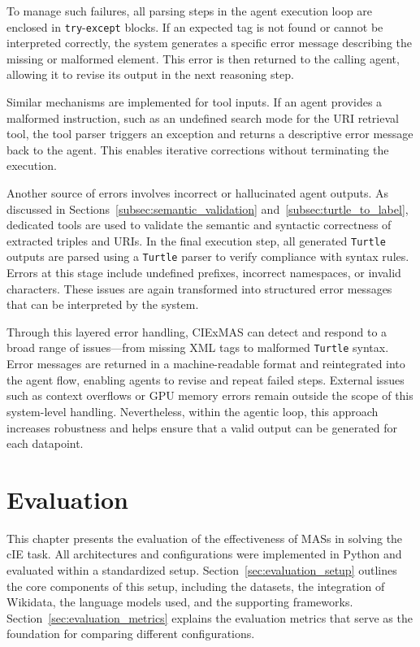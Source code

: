 \documentclass[a4paper,oneside,bibliography=totoc]{scrbook}
\begin{document}
To manage such failures, all parsing steps in the agent execution loop are enclosed in \texttt{try}-\texttt{except} blocks. If an expected tag is not found or cannot be interpreted correctly, the system generates a specific error message describing the missing or malformed element. This error is then returned to the calling agent, allowing it to revise its output in the next reasoning step.

Similar mechanisms are implemented for tool inputs. If an agent provides a malformed instruction, such as an undefined search mode for the URI retrieval tool, the tool parser triggers an exception and returns a descriptive error message back to the agent. This enables iterative corrections without terminating the execution.

Another source of errors involves incorrect or hallucinated agent outputs. As discussed in Sections~\ref{subsec:semantic_validation} and~\ref{subsec:turtle_to_label}, dedicated tools are used to validate the semantic and syntactic correctness of extracted triples and URIs. In the final execution step, all generated \texttt{Turtle} outputs are parsed using a \texttt{Turtle} parser to verify compliance with syntax rules. Errors at this stage include undefined prefixes, incorrect namespaces, or invalid characters. These issues are again transformed into structured error messages that can be interpreted by the system.

Through this layered error handling, CIExMAS can detect and respond to a broad range of issues—from missing XML tags to malformed \texttt{Turtle} syntax. Error messages are returned in a machine-readable format and reintegrated into the agent flow, enabling agents to revise and repeat failed steps. External issues such as context overflows or GPU memory errors remain outside the scope of this system-level handling. Nevertheless, within the agentic loop, this approach increases robustness and helps ensure that a valid output can be generated for each datapoint.

\chapter{Evaluation}
\label{ch:evaluation}

This chapter presents the evaluation of the effectiveness of \acp{MAS} in solving the \ac{cIE} task. All architectures and configurations were implemented in Python and evaluated within a standardized setup. Section~\ref{sec:evaluation_setup} outlines the core components of this setup, including the datasets, the integration of Wikidata, the language models used, and the supporting frameworks. Section~\ref{sec:evaluation_metrics} explains the evaluation metrics that serve as the foundation for comparing different configurations.
\end{document}
